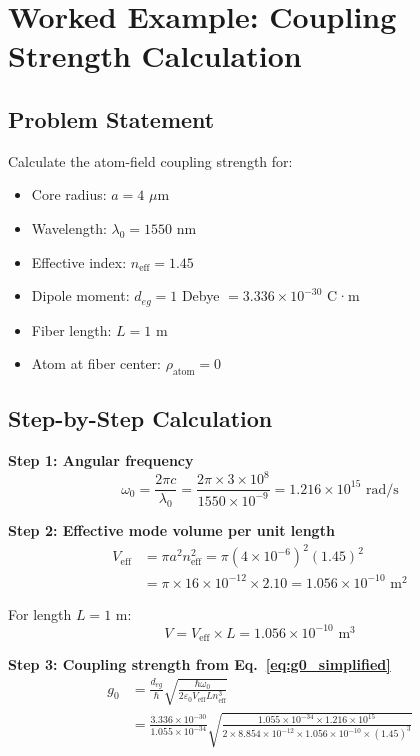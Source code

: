 \documentclass[12pt,a4paper]{article}
\begin{document}
\section{Worked Example: Coupling Strength Calculation}

\subsection{Problem Statement}

Calculate the atom-field coupling strength for:
\begin{itemize}[leftmargin=*]
\item Core radius: $a = 4$ $\mu$m
\item Wavelength: $\lambda_0 = 1550$ nm
\item Effective index: $n_{\text{eff}} = 1.45$
\item Dipole moment: $d_{eg} = 1$ Debye $= 3.336 \times 10^{-30}$ C·m
\item Fiber length: $L = 1$ m
\item Atom at fiber center: $\rho_{\text{atom}} = 0$
\end{itemize}

\subsection{Step-by-Step Calculation}

\textbf{Step 1: Angular frequency}
\begin{equation}
\omega_0 = \frac{2\pi c}{\lambda_0} = \frac{2\pi \times 3 \times 10^8}{1550 \times 10^{-9}} = 1.216 \times 10^{15} \text{ rad/s}
\end{equation}

\textbf{Step 2: Effective mode volume per unit length}
\begin{align}
V_{\text{eff}} &= \pi a^2 n_{\text{eff}}^2 = \pi (4 \times 10^{-6})^2 (1.45)^2\\
&= \pi \times 16 \times 10^{-12} \times 2.10 = 1.056 \times 10^{-10} \text{ m}^2
\end{align}

For length $L = 1$ m:
\begin{equation}
V = V_{\text{eff}} \times L = 1.056 \times 10^{-10} \text{ m}^3
\end{equation}

\textbf{Step 3: Coupling strength from Eq.~\eqref{eq:g0_simplified}}
\begin{align}
g_0 &= \frac{d_{eg}}{\hbar}\sqrt{\frac{\hbar\omega_0}{2\varepsilon_0 V_{\text{eff}} L n_{\text{eff}}^3}}\\
&= \frac{3.336 \times 10^{-30}}{1.055 \times 10^{-34}} \sqrt{\frac{1.055 \times 10^{-34} \times 1.216 \times 10^{15}}{2 \times 8.854 \times 10^{-12} \times 1.056 \times 10^{-10} \times (1.45)^3}}
\end{align}
\end{document}
